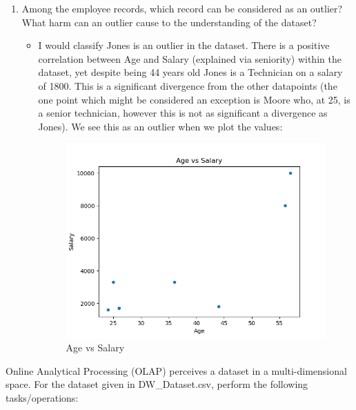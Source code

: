 \documentclass{scrreprt}
\begin{document}
\begin{enumerate}
	\item Among the employee records, which record can be considered as an outlier? What harm can an outlier cause to the understanding of the dataset?
		\begin{itemize}
			\item I would classify Jones is an outlier in the dataset. There is a positive correlation between Age and Salary (explained via seniority) within the dataset, yet despite being 44 years old Jones is a Technician on a salary of 1800. This is a significant divergence from the other datapoints (the one point which might be considered an exception is Moore who, at 25, is a senior technician, however this is not as significant a divergence as Jones). We see this as an outlier when we plot the values:
				\begin{figure}[h!]
				\centering
				\includegraphics[width=0.4\linewidth]{age_outlier.png}
				\caption{Age vs Salary}\label{q2}
			\end{figure}
		\end{itemize}
\end{enumerate}
\noindent Online Analytical Processing (OLAP) perceives a dataset in a multi-dimensional space. For the dataset given in DW\_Dataset.csv, perform the following tasks/operations:
\end{document}
